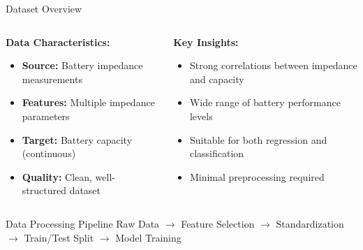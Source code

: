 \documentclass[aspectratio=169]{beamer}
\begin{document}
\begin{frame}{Dataset Overview}
\begin{columns}
\begin{column}{0.5\textwidth}
\textbf{Data Characteristics:}
\begin{itemize}
\item \textbf{Source:} Battery impedance measurements
\item \textbf{Features:} Multiple impedance parameters
\item \textbf{Target:} Battery capacity (continuous)
\item \textbf{Quality:} Clean, well-structured dataset
\end{itemize}
\end{column}
\begin{column}{0.5\textwidth}
\textbf{Key Insights:}
\begin{itemize}
\item Strong correlations between impedance and capacity
\item Wide range of battery performance levels
\item Suitable for both regression and classification
\item Minimal preprocessing required
\end{itemize}
\end{column}
\end{columns}

\vspace{0.5cm}
\begin{block}{Data Processing Pipeline}
Raw Data $\rightarrow$ Feature Selection $\rightarrow$ Standardization $\rightarrow$ Train/Test Split $\rightarrow$ Model Training
\end{block}
\end{frame}
\end{document}
